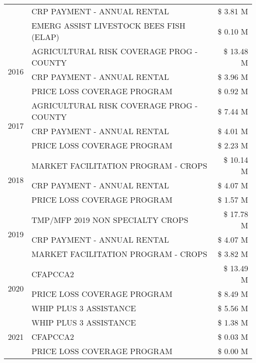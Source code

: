 \begin{tabular}{llr}
 & CRP PAYMENT - ANNUAL RENTAL & \$ 3.81 M \\
 & EMERG ASSIST LIVESTOCK BEES FISH (ELAP) & \$ 0.10 M \\
\cline{1-3}
\multirow[t]{3}{*}{2016} & AGRICULTURAL RISK COVERAGE PROG - COUNTY & \$ 13.48 M \\
 & CRP PAYMENT - ANNUAL RENTAL & \$ 3.96 M \\
 & PRICE LOSS COVERAGE PROGRAM & \$ 0.92 M \\
\cline{1-3}
\multirow[t]{3}{*}{2017} & AGRICULTURAL RISK COVERAGE PROG - COUNTY & \$ 7.44 M \\
 & CRP PAYMENT - ANNUAL RENTAL & \$ 4.01 M \\
 & PRICE LOSS COVERAGE PROGRAM & \$ 2.23 M \\
\cline{1-3}
\multirow[t]{3}{*}{2018} & MARKET FACILITATION PROGRAM - CROPS & \$ 10.14 M \\
 & CRP PAYMENT - ANNUAL RENTAL & \$ 4.07 M \\
 & PRICE LOSS COVERAGE PROGRAM & \$ 1.57 M \\
\cline{1-3}
\multirow[t]{3}{*}{2019} & TMP/MFP 2019 NON SPECIALTY CROPS & \$ 17.78 M \\
 & CRP PAYMENT - ANNUAL RENTAL & \$ 4.07 M \\
 & MARKET FACILITATION PROGRAM - CROPS & \$ 3.82 M \\
\cline{1-3}
\multirow[t]{3}{*}{2020} & CFAPCCA2 & \$ 13.49 M \\
 & PRICE LOSS COVERAGE PROGRAM & \$ 8.49 M \\
 & WHIP PLUS 3 ASSISTANCE & \$ 5.56 M \\
\cline{1-3}
\multirow[t]{3}{*}{2021} & WHIP PLUS 3 ASSISTANCE & \$ 1.38 M \\
 & CFAPCCA2 & \$ 0.03 M \\
 & PRICE LOSS COVERAGE PROGRAM & \$ 0.00 M \\
\cline{1-3}
\bottomrule
\end{tabular}
